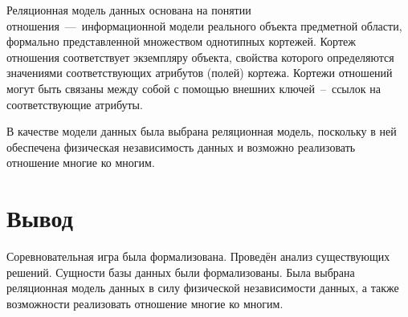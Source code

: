 Реляционная модель данных основана на понятии отношения~---~информационной модели реального объекта предметной области, формально представленной множеством однотипных кортежей. Кортеж отношения соответствует экземпляру объекта, свойства которого определяются значениями соответствующих атрибутов (полей) кортежа. Кортежи отношений могут быть связаны между собой с помощью внешних ключей~--~ссылок на соответствующие атрибуты.

В качестве модели данных была выбрана реляционная модель, поскольку в ней обеспечена физическая независимость данных и возможно реализовать отношение многие ко многим.

\section*{Вывод}

Соревновательная игра была формализована. Проведён анализ существующих решений. Сущности базы данных были формализованы. Была выбрана реляционная модель данных в силу физической независимости данных, а также возможности реализовать отношение многие ко многим.

\clearpage
